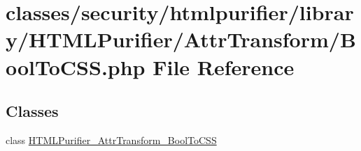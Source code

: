 \hypertarget{BoolToCSS_8php}{\section{classes/security/htmlpurifier/library/\+H\+T\+M\+L\+Purifier/\+Attr\+Transform/\+Bool\+To\+C\+S\+S.php File Reference}
\label{BoolToCSS_8php}
}
\subsection*{Classes}
\begin{DoxyCompactItemize}
\item 
class \hyperlink{classHTMLPurifier__AttrTransform__BoolToCSS}{H\+T\+M\+L\+Purifier\+\_\+\+Attr\+Transform\+\_\+\+Bool\+To\+C\+S\+S}
\end{DoxyCompactItemize}
